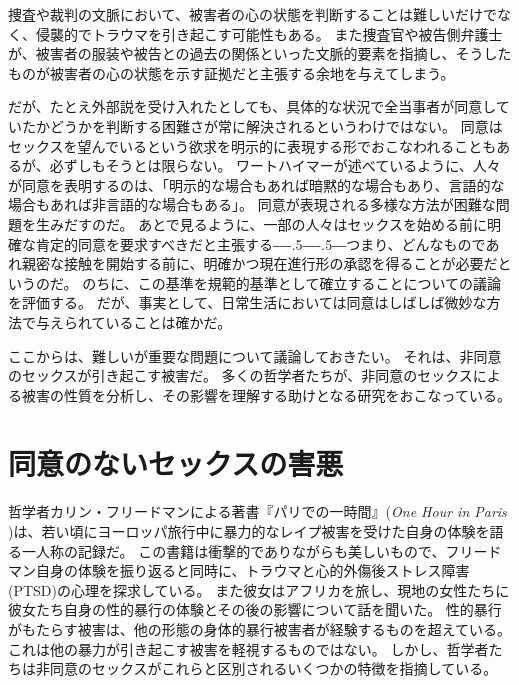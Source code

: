 \documentclass[paper=a4,book,openany]{jlreq}
\newcommand{\ig}[1]{}           %
\def\DDASH{―\kern-.5\zw―\kern-.5\zw―} %
\begin{document}
捜査や裁判の文脈において、被害者の心の状態を判断することは難しいだけでなく、侵襲的でトラウマを引き起こす可能性もある。
また捜査官や被告側弁護士が、被害者の服装や被告との過去の関係といった文脈的要素を指摘し、そうしたものが被害者の心の状態を示す証拠だと主張する余地を与えてしまう。

だが、たとえ外部説を受け入れたとしても、具体的な状況で全当事者が同意していたかどうかを判断する困難さが常に解決されるというわけではない。
同意はセックスを望んでいるという欲求を明示的に表現する形でおこなわれることもあるが、必ずしもそうとは限らない。
ワートハイマーが述べているように、人々が同意を表明するのは、「明示的な場合もあれば暗黙的な場合もあり、言語的な場合もあれば非言語的な場合もある」\citep[p.346]{wertheimer03:_consen_sexual_relat}。
同意が表現される多様な方法が困難な問題を生みだすのだ。
あとで見るように、一部の人々はセックスを始める前に明確な肯定的同意を要求すべきだと主張する{\DDASH}つまり、どんなものであれ親密な接触を開始する前に、明確かつ現在進行形の承認を得ることが必要だというのだ。
のちに、この基準を規範的基準として確立することについての議論を評価する。
だが、事実として、日常生活においては同意はしばしば微妙な方法で与えられていることは確かだ。

ここからは、難しいが重要な問題について議論しておきたい。
それは、非同意のセックスが引き起こす被害だ。
多くの哲学者たちが、非同意のセックスによる被害の性質を分析し、その影響を理解する助けとなる研究をおこなっている。

\section{同意のないセックスの害悪}

哲学者カリン・フリードマン\ig{Karyn L. Freedman}による著書『パリでの一時間』(\emph{One Hour in Paris} \citep{freedman14:_one_hour_paris})は、若い頃にヨーロッパ旅行中に暴力的なレイプ被害を受けた自身の体験を語る一人称の記録だ。
この書籍は衝撃的でありながらも美しいもので、フリードマン自身の体験を振り返ると同時に、トラウマと心的外傷後ストレス障害(PTSD)の心理を探求している。
また彼女はアフリカを旅し、現地の女性たちに彼女たち自身の性的暴行の体験とその後の影響について話を聞いた。
性的暴行がもたらす被害は、他の形態の身体的暴行被害者が経験するものを超えている。
これは他の暴力が引き起こす被害を軽視するものではない。
しかし、哲学者たちは非同意のセックスがこれらと区別されるいくつかの特徴を指摘している。
\end{document}
